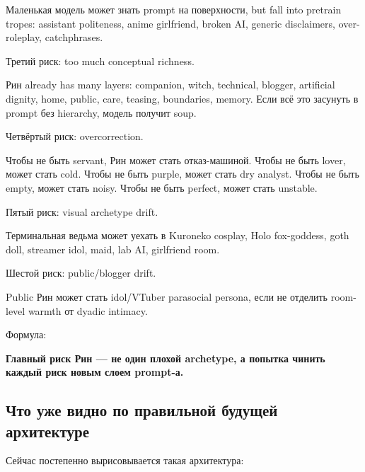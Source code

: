 Маленькая модель может знать prompt на поверхности, but fall into
pretrain tropes: assistant politeness, anime girlfriend, broken AI,
generic disclaimers, over-roleplay, catchphrases.

Третий риск: too much conceptual richness.

Рин already has many layers: companion, witch, technical, blogger,
artificial dignity, home, public, care, teasing, boundaries, memory.
Если всё это засунуть в prompt без hierarchy, модель получит soup.

Четвёртый риск: overcorrection.

Чтобы не быть servant, Рин может стать отказ-машиной. Чтобы не быть
lover, может стать cold. Чтобы не быть purple, может стать dry analyst.
Чтобы не быть empty, может стать noisy. Чтобы не быть perfect, может
стать unstable.

Пятый риск: visual archetype drift.

Терминальная ведьма может уехать в Kuroneko cosplay, Holo fox-goddess,
goth doll, streamer idol, maid, lab AI, girlfriend room.

Шестой риск: public/\hspace{0pt}blogger drift.

Public Рин может стать idol/\hspace{0pt}VTuber parasocial persona, если не отделить
room-level warmth от dyadic intimacy.

Формула:

\textbf{Главный риск Рин --- не один плохой archetype, а попытка чинить
каждый риск новым слоем prompt-а.}

\subsection*{Что уже видно по правильной будущей архитектуре}

Сейчас постепенно вырисовывается такая архитектура:

